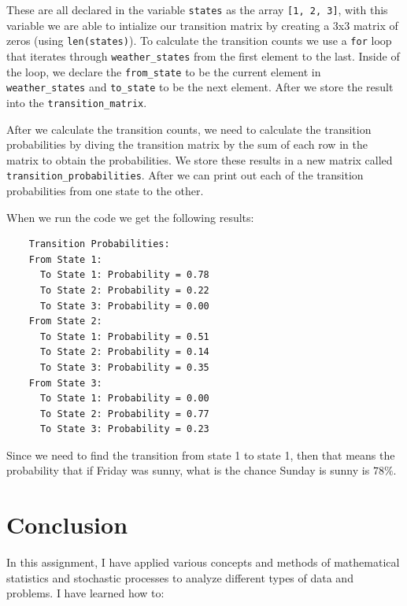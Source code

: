 \documentclass[11pt, letterpaper]{article}
\begin{document}
These are all declared in the variable \verb|states| as the array
\verb|[1, 2, 3]|, with this variable
we are able to intialize our transition matrix by creating a 3x3 matrix of
zeros (using \verb|len(states)|).
To calculate the transition counts we use a \verb|for| loop that iterates
through \verb|weather_states| from
the first element to the last. Inside of the loop, we declare the
\verb|from_state| to be the current element in
\verb|weather_states| and \verb|to_state| to be the next element. After we
store the result into the \verb|transition_matrix|.

After we calculate the transition counts, we need to calculate the transition
probabilities by diving the
transition matrix by the sum of each row in the matrix to obtain the
probabilities. We store these
results in a new matrix called \verb|transition_probabilities|. After we can
print out each of the
transition probabilities from one state to the other.

\begin{file}[q7.py (rest)]
	
\end{file}

When we run the code we get the following results:
\begin{verbatim}
	Transition Probabilities:
	From State 1:
	  To State 1: Probability = 0.78
	  To State 2: Probability = 0.22
	  To State 3: Probability = 0.00
	From State 2:
	  To State 1: Probability = 0.51
	  To State 2: Probability = 0.14
	  To State 3: Probability = 0.35
	From State 3:
	  To State 1: Probability = 0.00
	  To State 2: Probability = 0.77
	  To State 3: Probability = 0.23	
\end{verbatim}

Since we need to find the transition from state 1 to state 1, then that means
the probability that if Friday was sunny, what is the chance Sunday is sunny is
$78\%$.
\newpage
\section*{Conclusion}

In this assignment, I have applied various concepts and methods of mathematical
statistics and stochastic processes to analyze different types of data and
problems. I have learned how to:
\end{document}
